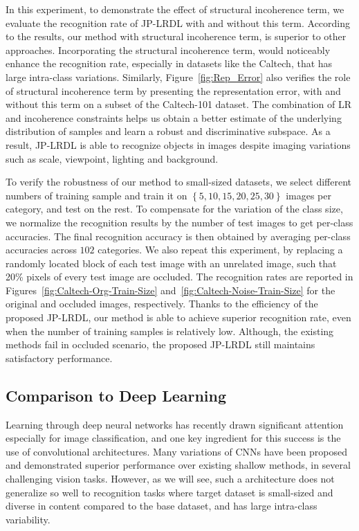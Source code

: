 \documentclass[journal]{IEEEtran}
\begin{document}
In this experiment, to demonstrate the effect of structural incoherence term, we evaluate the recognition rate of JP-LRDL with and without this term. According to the results, our method with structural incoherence term, is superior to other approaches. Incorporating the structural incoherence term, would noticeably enhance the recognition rate, especially in datasets like the Caltech, that has large intra-class variations. Similarly, Figure~\ref{fig:Rep_Error} also verifies the role of structural incoherence term by presenting the representation error, with and without this term on a subset of the Caltech-101 dataset. The combination of LR and incoherence constraints helps us obtain a better estimate of the underlying distribution of samples and learn a robust and discriminative subspace. As a result, JP-LRDL is able to recognize objects in images despite imaging variations such as scale, viewpoint, lighting and background. 

To verify the robustness of our method to small-sized datasets, we select different numbers of training sample and train it on $\left \{5, 10, 15, 20, 25, 30\right \}$ images per category, and test on the rest. To compensate for the variation of the class size, we normalize the recognition results by the number of test images to get per-class accuracies. The final recognition accuracy is then obtained by averaging per-class accuracies across $102$ categories. We also repeat this experiment, by replacing a randomly located block of each test image with an unrelated image, such that 20\% pixels of every test image are occluded. The recognition rates are reported in Figures~\ref{fig:Caltech-Org-Train-Size} and~\ref{fig:Caltech-Noise-Train-Size} for the original and occluded images, respectively. Thanks to the efficiency of the proposed JP-LRDL, our method is able to achieve superior recognition rate, even when the number of training samples is relatively low. Although, the existing methods fail in occluded scenario, the proposed JP-LRDL still maintains satisfactory performance.
\subsection{Comparison to Deep Learning}
Learning through deep neural networks has recently drawn significant attention especially for image classification, and one key ingredient for this success is the use of convolutional architectures. Many variations of CNNs have been proposed and demonstrated superior performance over existing shallow methods, in several challenging vision tasks. However, as we will see, such a architecture does not generalize so well to recognition tasks where target dataset is small-sized and diverse in content compared to the base dataset, and has large intra-class variability.
\end{document}
